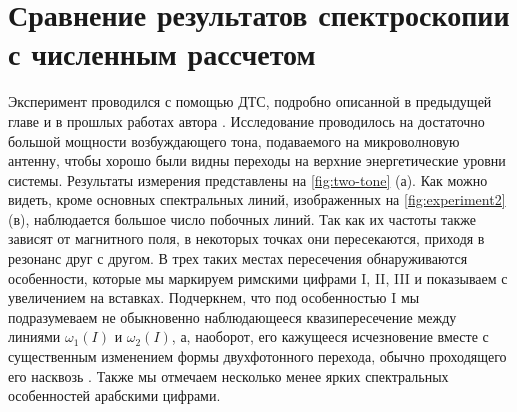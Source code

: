\documentclass[14pt, a4paper]{extreport}
\numberwithin{equation}{section}
\begin{document}
\section{Сравнение результатов спектроскопии с численным рассчетом}

Эксперимент проводился с помощью ДТС, подробно описанной в предыдущей главе и в прошлых работах автора \cite{fedorov2017}. Исследование проводилось на достаточно большой мощности возбуждающего тона, подаваемого на микроволновую антенну, чтобы хорошо были видны переходы на верхние энергетические уровни системы. Результаты измерения представлены на \autoref{fig:two-tone} (а). Как можно видеть, кроме основных спектральных линий, изображенных на \autoref{fig:experiment2} (в), наблюдается большое число побочных линий. Так как их частоты также зависят от магнитного поля, в некоторых точках они пересекаются, приходя в резонанс друг с другом. В трех таких местах пересечения обнаруживаются особенности, которые мы маркируем римскими цифрами I, II, III и показываем с увеличением на вставках. Подчеркнем, что под особенностью I мы подразумеваем не обыкновенно наблюдающееся квазипересечение между линиями $\omega_1(I)$ и $\omega_2(I)$, а, наоборот, его кажущееся исчезновение вместе с существенным изменением формы двухфотонного перехода, обычно проходящего его насквозь \cite{filipp2011multimode}. Также мы отмечаем несколько менее ярких спектральных особенностей арабскими цифрами.
\end{document}
